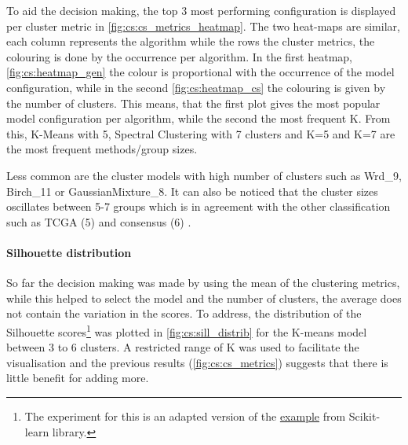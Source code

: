 To aid the decision making, the top 3 most performing configuration is displayed per cluster metric in \cref{fig:cs:cs_metrics_heatmap}. The two heat-maps are similar, each column represents the algorithm while the rows the cluster metrics, the colouring is done by the occurrence per algorithm. In the first heatmap, \cref{fig:cs:heatmap_gen} the colour is proportional with the occurrence of the model configuration, while in the second \cref{fig:cs:heatmap_cs} the colouring is given by the number of clusters. This means, that the first plot gives the most popular model configuration per algorithm, while the second the most frequent K. From this, K-Means with 5, Spectral Clustering with 7 clusters and K=5 and K=7 are the most frequent methods/group sizes. 

Less common are the cluster models with high number of clusters such as Wrd\_9, Birch\_11 or GaussianMixture\_8. It can also be noticed that the cluster sizes oscillates between 5-7 groups which is in agreement with the other classification such as TCGA (5) and consensus (6) \citet{Robertson2017-mg,Kamoun2020-tj}.


\paragraph*{Silhouette distribution}

So far the decision making was made by using the mean of the clustering metrics, while this helped to select the model and the number of clusters, the average does not contain the variation in the scores. To address, the distribution of the Silhouette scores\footnote{The experiment for this is an adapted version of the \href{https://tinyurl.com/sillhouete-distrib}{example} from Scikit-learn library.} was plotted in \cref{fig:cs:sill_distrib} for the K-means model between 3 to 6 clusters. A restricted range of K was used to facilitate the visualisation and the previous results (\cref{fig:cs:cs_metrics}) suggests that there is little benefit for adding more. 


